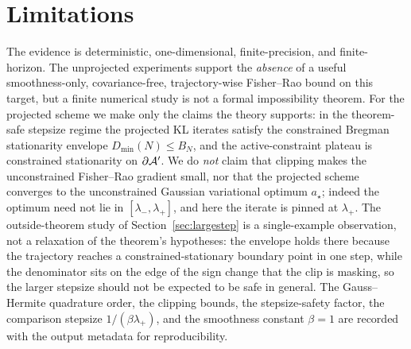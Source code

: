 \documentclass[11pt]{article}
\begin{document}
\section{Limitations}
\label{sec:limitations}

The evidence is deterministic, one-dimensional, finite-precision, and
finite-horizon. The unprojected experiments support the \emph{absence} of a
useful smoothness-only, covariance-free, trajectory-wise Fisher--Rao bound on
this target, but a finite numerical study is not a formal impossibility theorem.
For the projected scheme we make only the claims the theory supports: in the
theorem-safe stepsize regime the projected KL iterates satisfy the constrained
Bregman stationarity envelope $D_{\min}(N)\le B_N$, and the active-constraint
plateau is constrained stationarity on $\partial\mathcal{A}'$. We do \emph{not}
claim that clipping makes the unconstrained Fisher--Rao gradient small, nor that
the projected scheme converges to the unconstrained Gaussian variational optimum
$a_\star$; indeed the optimum need not lie in $[\lambda_-,\lambda_+]$, and here
the iterate is pinned at $\lambda_+$. The outside-theorem study of
Section~\ref{sec:largestep} is a single-example observation, not a relaxation of
the theorem's hypotheses: the envelope holds there because the trajectory reaches
a constrained-stationary boundary point in one step, while the denominator sits
on the edge of the sign change that the clip is masking, so the larger stepsize
should not be expected to be safe in general. The Gauss--Hermite quadrature
order, the clipping bounds, the stepsize-safety factor, the comparison stepsize
$1/(\beta\lambda_+)$, and the smoothness constant $\beta=1$ are recorded with the
output metadata for reproducibility.
\end{document}
